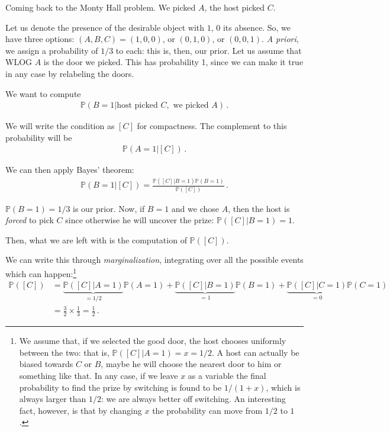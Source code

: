 \documentclass[main.tex]{subfiles}
\begin{document}

Coming back to the Monty Hall problem. 
We picked \(A\), the host picked \(C\). 

Let us denote the presence of the desirable object with \(1\), \(0\) its absence.
So, we have three options: \((A, B, C) = (1, 0, 0)\), or \((0,1, 0)\), or \((0,0, 1)\). \emph{A priori}, we assign a probability of \(1/3\) to each: this is, then, our prior. 
Let us assume that WLOG \(A\) is the door we picked. This has probability 1, since we can make it true in any case by relabeling the doors. 

We want to compute 
%
\begin{align}
\mathbb{P}(B = 1| \text{host picked }C, \text{ we picked } A)
\,.
\end{align}

We will write the condition as \([C]\) for compactness. 
The complement to this probability will be 
%
\begin{align}
\mathbb{P}(A = 1 | [C])
\,.
\end{align}

We can then apply Bayes' theorem: 
%
\begin{align}
\mathbb{P}(B=1 | [C]) = \frac{\mathbb{P}([C] | B=1) \mathbb{P}(B=1)}{\mathbb{P}([C])}
\,.
\end{align}

\(\mathbb{P}(B=1) = 1/3\) is our prior.
Now, if \(B=1\) and we chose \(A\), then the host is \emph{forced} to pick \(C\) since otherwise he will uncover the prize: \(\mathbb{P}([C] | B=1) = 1\). 

Then, what we are left with is the computation of \(\mathbb{P}([C])\). 


We can write this through \emph{marginalization}, integrating over all the possible events which can happen:\footnote{We assume that, if we selected the good door, the host chooses uniformly between the two: that is, \(\mathbb{P}([C] | A = 1) = x = 1/2\). A host can actually be biased towards \(C\) or \(B\), maybe he will choose the nearest door to him or something like that. In any case, if we leave \(x\) as a variable the final probability to find the prize by switching is found to be \(1 /(1+x) \), which is always larger than \(1/2\): we are always better off switching. An interesting fact, however, is that by changing \(x\) the probability can move from \(1/2\) to \(1\).}
%
\begin{align}
\mathbb{P}([C]) &= 
\underbrace{\mathbb{P}([C] | A=1)}_{=1/2}\mathbb{P}(A=1) +
\underbrace{\mathbb{P}([C] | B=1)}_{= 1}\mathbb{P}(B=1) +
\underbrace{\mathbb{P}([C] | C=1)}_{=0}\mathbb{P}(C=1) \\
&= \frac{3}{2} \times \frac{1}{3} = \frac{1}{2}
\,.
\end{align}
\end{document}
